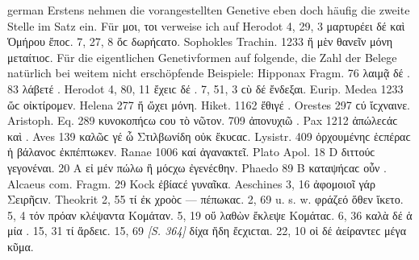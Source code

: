 \begin{otherlanguage*}{german}
Erstens nehmen die vorangestellten Genetive eben doch häufig die zweite Stelle im Satz ein. Für μοι, τοι verweise ich auf Herodot 4, 29, 3 μαρτυρέει δέ  καὶ Ὁμήρου ἔποϲ. 7, 27, 8 ὅϲ  δωρήϲατο. Sophokles Trachin. 1233 ἥ  μὲν θανεῖν μόνη μεταίτιοϲ. Für die eigentlichen Genetivformen auf folgende, die Zahl der Belege natürlich bei weitem nicht erschöpfende Beispiele: Hipponax Fragm. 76 λαιμᾷ δέ . 83 λάβετέ . Herodot 4, 80, 11 ἔχειϲ δέ . 7, 51, 3 ϲὺ δέ  ἔνδεξαι. Eurip. Medea 1233 ὥϲ  οἰκτίρομεν. Helena 277 ἥ  ὤχει μόνη. Hiket. 1162 ἔθιγέ . Orestes 297 ϲύ  ἴϲχναινε. Aristoph. Eq. 289 κυνοκοπήϲω ϲου τὸ νῶτον. 709 ἀπονυχιῶ . Pax 1212 ἀπώλεϲάϲ  καὶ . Aves 139 καλῶϲ γέ  ὦ Στιλβωνίδη οὐκ ἔκυϲαϲ. Lysistr. 409 ὀρχουμένηϲ  ἑϲπέραϲ ἡ βάλανοϲ ἐκπέπτωκεν. Ranae 1006 καί  ἀγανακτεῖ. Plato Apol. 18 D διττούϲ  γεγονέναι. 20 Α εἰ μέν  πώλω ἢ μόϲχω ἐγενέϲθην. \mbox{Phaedo} 89 Β καταψήϲαϲ οὖν . Alcaeus com. Fragm. 29 Kock ἐβίαϲέ  γυναῖκα. Aeschines 3, 16 ἀφομοιοῖ γάρ  Σειρῆϲιν. Theokrit 2, 55 τί  ἐκ χροὸϲ  — πέπωκαϲ. 2, 69 u. s. w. φράζεό  ὅθεν ἵκετο. 5, 4 τόν  πρόαν κλέψαντα Κομάταν. 5, 19 οὔ  λαθὼν ἔκλεψε Κομάταϲ. 6, 36 καλὰ δέ  ἁ μία . 15, 31 τί  ἄρδειϲ. 15, 69 \hypertarget{p364}{\emph{[S. 364]}}\label{p364} δίχα  ἤδη ἔϲχιϲται. 22, 10 οἱ δέ  ἀείραντεϲ μέγα κῦμα.


\end{otherlanguage*}
